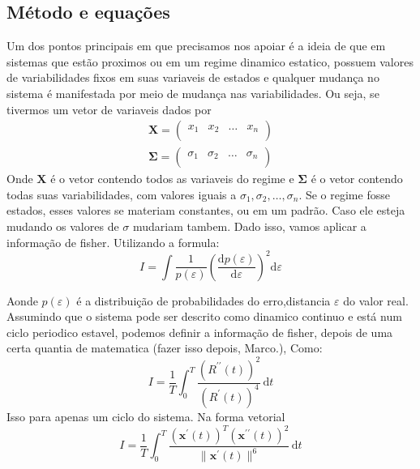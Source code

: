 \documentclass{report}[12pt]
\begin{document}
\subsection{Método e equações}
Um dos pontos principais em que precisamos nos apoiar é a ideia de que em sistemas que estão proximos
ou em um regime dinamico estatico, possuem valores de variabilidades fixos em suas variaveis de estados
e qualquer mudança no sistema é manifestada por meio de mudança nas variabilidades. Ou seja,
se tivermos um vetor de variaveis dados por
\begin{gather*}
    \mathbf{X} =
    \begin{pmatrix}
        x_ 1 & x_ 2 & \ldots  &  x_ n \\
    \end{pmatrix}\\
    \mathbf{\Sigma}=  
    \begin{pmatrix}
        \sigma _1 & \sigma _2 & \ldots  &  \sigma _n \\
    \end{pmatrix}
\end{gather*}
Onde \(\mathbf{X} \) é o vetor contendo todos as variaveis do regime e \(\mathbf{\Sigma} \) é o vetor
contendo todas suas variabilidades, com valores iguais a \(\sigma _1,\sigma _2,\ldots ,\sigma _n\).
Se o regime fosse estados, esses valores se materiam constantes, ou em um padrão. Caso ele esteja mudando
os valores de \(\sigma \) mudariam tambem. Dado isso, vamos aplicar a informação de fisher. Utilizando
a formula:
\begin{equation}
    I=\int \frac{1}{p(\varepsilon )}(\frac{\mathrm{d}p(\varepsilon )}{\mathrm{d}\varepsilon  })^{2} \mathrm{d} \varepsilon
\end{equation}
 
Aonde \(p(\varepsilon )\) é a distribuição de probabilidades do erro,distancia \(\varepsilon \) do valor real.
Assumindo que o sistema pode ser descrito como dinamico continuo e está num ciclo periodico estavel, podemos
definir a informação de fisher, depois de uma certa quantia de matematica (fazer isso depois, Marco.), Como:
\begin{equation}
    I=\frac{1}{T}\int_{0}^{T} \frac{(R^{\prime \prime }(t))^{2} }{(R^\prime (t))^4} \,\mathrm{d}t 
\end{equation}
Isso para apenas um ciclo do sistema. Na forma vetorial
\begin{equation}
    I=\frac{1}{T}\int_{0}^{T} \frac{(\mathbf{x}^\prime(t))^T (\mathbf{x}^{\prime \prime}(t))^{2} }{\lVert \mathbf{x^\prime } (t) \rVert ^6} \,\mathrm{d}t
\end{equation}
    
\end{document}
